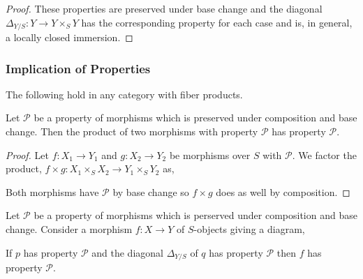 \documentclass[12pt]{article}
\begin{document}
\begin{proof}
These properties are preserved under base change and the diagonal $\Delta_{Y/S} : Y \to Y \times_S Y$ has the corresponding property for each case and is, in general, a locally closed immersion.
\end{proof}

\subsubsection{Implication of Properties}

\begin{rmk}
The following hold in any category with fiber products.
\end{rmk}

\newcommand{\cP}{\mathcal{P}}

\begin{prop}
Let $\cP$ be a property of morphisms which is preserved under composition and base change. Then the product of two morphisms with property $\cP$ has property $\cP$.
\end{prop}

\begin{proof}
Let $f : X_1 \to Y_1$ and $g : X_2 \to Y_2$ be morphisms over $S$ with $\cP$. We factor the product, 
$f \times g : X_1 \times_S X_2 \to Y_1 \times_S Y_2$ as,
\begin{center}
\end{center}
Both morphisms have $\cP$ by base change so $f \times g$ does as well by composition. 
\end{proof}

\begin{prop}
Let $\cP$ be a property of morphisms which is perserved under composition and base change. Consider a morphism $f : X \to Y$ of $S$-objects giving a diagram,
\begin{center}
\end{center}
If $p$ has property $\cP$ and the diagonal $\Delta_{Y/S}$ of $q$ has property $\cP$ then $f$ has property $\cP$.
\end{prop}
\end{document}
